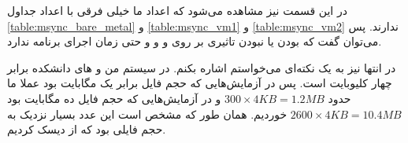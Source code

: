 در این قسمت نیز مشاهده می‌شود که اعداد ما خیلی فرقی با اعداد جداول
\ref{table:msync_bare_metal} و \ref{table:msync_vm1} و \ref{table:msync_vm2}
ندارند. پس می‌توان گفت که
بودن یا نبودن تاثیری بر روی
 و  و 
و حتی زمان اجرای برنامه ندارد.

در انتها نیز به یک نکته‌ای می‌خواستم اشاره بکنم. در سیستم من و
های
دانشکده
برابر چهار کلیوبایت است. پس در آزمایش‌هایی که حجم فایل برابر یک مگابایت بود عملا ما حدود
$300 \times 4KB = 1.2MB$
و در آزمایش‌هایی که حجم فایل ده مگابایت بود
$2600 \times 4KB = 10.4MB$
خوردیم. همان طور که مشخص است این عدد بسیار نزدیک به حجم فایلی بود که از دیسک
کردیم.